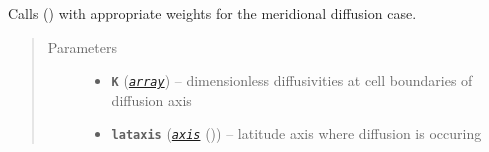 \documentclass[a4paper,10pt,english]{sphinxmanual}
\begin{document}
\begin{fulllineitems}
\label{api/climlab.dynamics:climlab.dynamics.diffusion._make_meridional_diffusion_matrix}
Calls {\hyperref[api/climlab.dynamics:climlab.dynamics.diffusion._make_diffusion_matrix]{\emph{}}} () with appropriate weights for 
the meridional diffusion case.
\begin{quote}\begin{description}
\item[{Parameters}] \leavevmode\begin{itemize}
\item {} 
\textbf{\texttt{K}} (\href{http://docs.python.org/2.7/library/array.html\#module-array}{\emph{\texttt{array}}}) -- dimensionless diffusivities at cell boundaries
of diffusion axis 

\item {} 
\textbf{\texttt{lataxis}} ({\hyperref[api/climlab.domain:module\string-climlab.domain.axis]{\emph{\emph{\texttt{axis}}}}} ()) -- latitude axis where diffusion is occuring

\end{itemize}

\end{description}\end{quote}


\end{fulllineitems}
\end{document}
